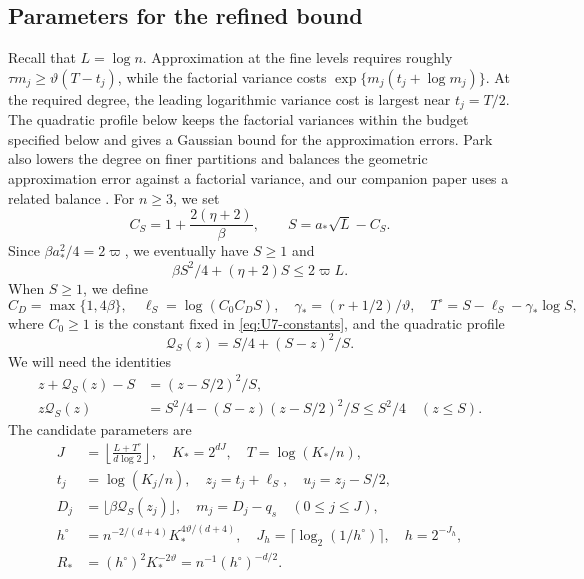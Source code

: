 \subsection*{Parameters for the refined bound}
Recall that $L=\log n$. Approximation at the fine levels requires
roughly $\tau m_j\ge\vartheta(T-t_j)$, while the factorial variance costs
$\exp\{m_j(t_j+\log m_j)\}$. At the required degree, the leading logarithmic variance cost is
largest near $t_j=T/2$. The quadratic profile below keeps the factorial
variances within the budget specified below and gives a Gaussian bound for the approximation errors.
Park \cite[Sections~3.3--3.4]{Park2026} also lowers the degree on finer
partitions and balances the geometric approximation error against a
factorial variance, and our companion paper uses a related balance
\cite[Section~4.4]{AronowKallusLopatto2026}.
For $n\ge3$, we set
\begin{equation}\label{eq:Udef-S}
 C_S=1+\frac{2(\eta+2)}{\beta},\qquad S=a_*\sqrt L-C_S.
\end{equation}
Since $\beta a_*^2/4=2\varpi$, we eventually have $S\ge1$ and
\begin{equation}\label{eq:Udef-budget}
 \beta S^2/4+(\eta+2)S\le2\varpi L.
\end{equation}
When $S\ge1$, we define
\begin{equation}\label{eq:Udef-degree-constants}
 C_D=\max\{1,4\beta\},\quad \ell_S=\log(C_0C_DS),\quad
 \gamma_*=(r+1/2)/\vartheta,\quad
 T^\circ=S-\ell_S-\gamma_*\log S,
\end{equation}
where $C_0\ge1$ is the constant fixed in \eqref{eq:U7-constants}, and
the quadratic profile
\begin{equation}\label{eq:Udef-degree-profile}
 \mathcal Q_S(z)=S/4+(S-z)^2/S.
\end{equation}
We will need the identities
\begin{align}
 z+\mathcal Q_S(z)-S&=(z-S/2)^2/S,\label{eq:Udef-profile-slack}\\
 z\mathcal Q_S(z)&=S^2/4-(S-z)(z-S/2)^2/S\le S^2/4
 \quad(z\le S).\label{eq:Udef-profile-variance}
\end{align}
The candidate parameters are
\begin{equation}\label{eq:Udef-params}
\begin{aligned}
 J&=\left\lfloor\frac{L+T^\circ}{d\log2}\right\rfloor,
 \quad K_*=2^{dJ},\quad T=\log(K_*/n),\\
 t_j&=\log(K_j/n),\quad z_j=t_j+\ell_S,\quad u_j=z_j-S/2,\\
 D_j&=\lfloor\beta\mathcal Q_S(z_j)\rfloor,
 \quad m_j=D_j-q_s\quad(0\le j\le J),\\
 h^\circ&=n^{-2/(d+4)}K_*^{4\vartheta/(d+4)},
 \quad J_h=\lceil\log_2(1/h^\circ)\rceil,\quad h=2^{-J_h},\\
 R_*&=(h^\circ)^2K_*^{-2\vartheta}=n^{-1}(h^\circ)^{-d/2}.
\end{aligned}
\end{equation}
